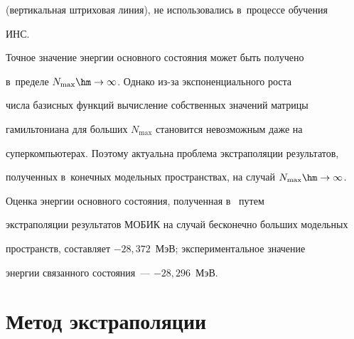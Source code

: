 (вертикальная штриховая линия), не использовались в~процессе обуче\-ния 


ИНС.


  











  Точное значение энергии основного состояния может быть получено 


в~пределе $N_{\max}\hm\to \infty$. Однако из-за экспоненциального рос\-та 


чис\-ла базисных функций вы\-чис\-ле\-ние собственных значений мат\-ри\-цы 


гамильтониана для больших $N_{\max}$ становится не\-воз\-мож\-ным даже на 


суперкомпьютерах. Поэтому актуальна проб\-ле\-ма экстраполяции результатов, 


полученных в~конечных модельных пространствах, на случай $N_{\max}\hm\to 


\infty$.


  


  Оценка энергии основного состояния, полученная в~\cite{5-b} путем 


экстраполяции результатов \mbox{МОБИК} на случай бесконечно больших модельных 


пространств, со\-став\-ля\-ет $-28{,}372$~МэВ; экспериментальное значение 


энергии связанного со\-сто\-яния~--- $-28{,}296$~МэВ.





\vspace*{-2pt}


  


\section{Метод экстраполяции}





\vspace*{-2pt}














